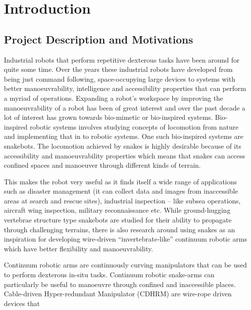 \documentclass[a4paper,12pt]{report}
\begin{document}
\pagebreak



\tableofcontents

\pagebreak

\begin{abstract}
    \ldots
    
\end{abstract}

\chapter{Introduction}
\section{Project Description and Motivations}
Industrial robots that perform repetitive dexterous tasks have been around for quite some time. Over the years these industrial robots have developed from being just command following, space-occupying large devices to systems with better manoeuvrability, intelligence and accessibility properties that can perform a myriad of operations. Expanding a robot's workspace by improving the manoeuvrability of a robot has been of great interest and over the past decade a lot of interest has grown towards bio-mimetic or bio-inspired systems. Bio-inspired robotic systems involves studying concepts of locomotion from nature and implementing that in to robotic systems. One such bio-inspired systems are snakebots. The locomotion achieved by snakes is highly desirable because of its accessibility and manoeuvrability properties which means that snakes can access confined spaces and manoeuver through different kinds of terrain.

This makes the robot very useful as it finds itself a wide range of applications such as disaster management (it can collect data and images from inaccessible areas at search and rescue sites), industrial inspection – like subsea operations, aircraft wing inspection, military reconnaissance etc. While ground-hugging vertebrae structure type snakebots are studied for their ability to propagate through challenging terrains, there is also research around using snakes as an inspiration for developing wire-driven “invertebrate‐like” continuum robotic arms which have better flexibility and manoeuvrability.  

Continuum robotic arms are continuously curving manipulators that can be used to perform dexterous in-situ tasks. Continuum robotic snake-arms can particularly be useful to manoeuvre through confined and inaccessible places. Cable-driven Hyper-redundant Manipulator (CDHRM) are wire-rope driven devices that 
\end{document}
